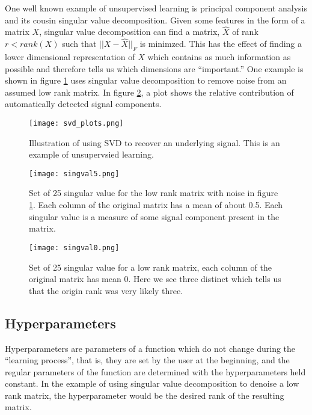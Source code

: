 One well known example of unsupervised learning is principal component analysis and its cousin singular value decomposition.  Given some features in the form of a matrix $X$, singular value decomposition can find a matrix, $\hat{X}$ of rank $r < rank(X)$ such that $||X-\hat{X}||_F$ is minimzed.  This has the effect of finding a lower dimensional representation of $X$ which contains as much information as possible and therefore tells us which dimensions are ``important.''  One example is shown in figure \ref{fig:svd_recover} uses singular value decomposition to remove noise from an assumed low rank matrix.  In figure \ref{fig:singular_values}, a plot shows the relative contribution of automatically detected signal components.

\begin{figure}
    \centering
    \texttt{[image: svd\_plots.png]}
    \caption{Illustration of using SVD to recover an underlying signal.  This is an example of unsupervsied learning.}
    \label{fig:svd_recover}
\end{figure}
\begin{figure}
    \centering
    \texttt{[image: singval5.png]}
    \caption{Set of 25 singular value for the low rank matrix with noise in figure \ref{fig:svd_recover}.  Each column of the original matrix has a mean of about 0.5.  Each singular value is a measure of some signal component present in the matrix.}
    \label{fig:singular_values}
\end{figure}
\begin{figure}
    \centering
    \texttt{[image: singval0.png]}
    \caption{Set of 25 singular value for a low rank matrix, each column of the original matrix has mean 0.  Here we see three distinct which tells us that the origin rank was very likely three.}
    \label{fig:singval_good}
\end{figure}

\subsection{Hyperparameters} \label{sec:hyperparameters}
Hyperparameters are parameters of a function which do not change during the ``learning process'', that is, they are set by the user at the beginning, and the regular parameters of the function are determined with the hyperparameters held constant.  In the example of using singular value decomposition to denoise a low rank matrix, the hyperparameter would be the desired rank of the resulting matrix.  

